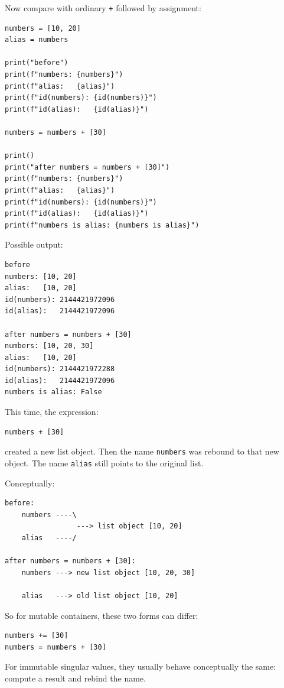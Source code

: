 Now compare with ordinary \texttt{+} followed by assignment:

\begin{verbatim}
numbers = [10, 20]
alias = numbers

print("before")
print(f"numbers: {numbers}")
print(f"alias:   {alias}")
print(f"id(numbers): {id(numbers)}")
print(f"id(alias):   {id(alias)}")

numbers = numbers + [30]

print()
print("after numbers = numbers + [30]")
print(f"numbers: {numbers}")
print(f"alias:   {alias}")
print(f"id(numbers): {id(numbers)}")
print(f"id(alias):   {id(alias)}")
print(f"numbers is alias: {numbers is alias}")
\end{verbatim}

Possible output:

\begin{verbatim}
before
numbers: [10, 20]
alias:   [10, 20]
id(numbers): 2144421972096
id(alias):   2144421972096

after numbers = numbers + [30]
numbers: [10, 20, 30]
alias:   [10, 20]
id(numbers): 2144421972288
id(alias):   2144421972096
numbers is alias: False
\end{verbatim}

This time, the expression:

\begin{verbatim}
numbers + [30]
\end{verbatim}

created a new list object. Then the name \texttt{numbers} was rebound to that new object. The name \texttt{alias} still points to the original list.

Conceptually:

\begin{verbatim}
before:
    numbers ----\
                 ---> list object [10, 20]
    alias   ----/

after numbers = numbers + [30]:
    numbers ---> new list object [10, 20, 30]

    alias   ---> old list object [10, 20]
\end{verbatim}

So for mutable containers, these two forms can differ:

\begin{verbatim}
numbers += [30]
numbers = numbers + [30]
\end{verbatim}

For immutable singular values, they usually behave conceptually the same: compute a result and rebind the name.

